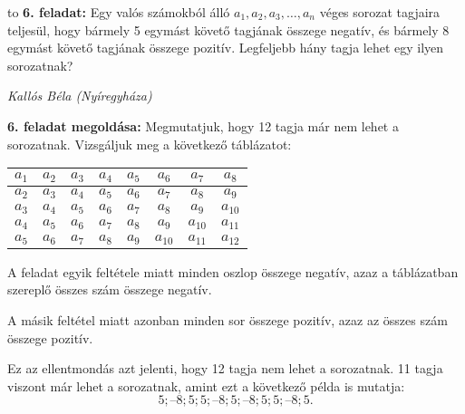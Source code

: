 \documentclass[a4paper,10pt]{article}
\def\ki#1#2{\hfill {\it #1 (#2)}\medskip}
\begin{document}
\hbox to 
{\bf 6. feladat: } Egy valós számokból álló $a_1, a_2, a_3,\dots, a_n$ véges sorozat tagjaira teljesül, hogy bármely 5 egymást
követő tagjának összege negatív, és bármely 8 egymást követő tagjának összege pozitív. Legfeljebb
hány tagja lehet egy ilyen sorozatnak?

\ki{Kallós Béla}{Nyíregyháza}\medskip

{\bf 6. feladat megoldása: }
Megmutatjuk, hogy 12 tagja már nem lehet a sorozatnak.
Vizsgáljuk meg a következő táblázatot:
\begin{center}
\begin{tabular}{|c|c|c|c|c|c|c|c|}
\hline
$a_1$ & $a_2$ & $a_3$ & $a_4$ & $a_5$ & $a_6$ & $a_7$ & $a_8$ \\
\hline
$a_2$ & $a_3$ & $a_4$ & $a_5$ & $a_6$ & $a_7$ & $a_8$ & $a_9$ \\
\hline
$a_3$ & $a_4$ & $a_5$ & $a_6$ & $a_7$ & $a_8$ & $a_9$ & $a_{10}$ \\
\hline
$a_4$ & $a_5$ & $a_6$ & $a_7$ & $a_8$ & $a_9$ & $a_{10}$ & $a_{11}$ \\
\hline
$a_5$ & $a_6$ & $a_7$ & $a_8$ & $a_9$ & $a_{10}$ & $a_{11}$ & $a_{12}$ \\
\hline
\end{tabular}
\end{center}

A feladat egyik feltétele miatt minden oszlop összege negatív, azaz a táblázatban szereplő
összes szám összege negatív.

A másik feltétel miatt azonban minden sor összege pozitív, azaz az összes szám összege
pozitív.

Ez az ellentmondás azt jelenti, hogy 12 tagja nem lehet a sorozatnak.
11 tagja viszont már lehet a sorozatnak, amint ezt a következő példa is mutatja:
$$5; –8; 5; 5; –8; 5; –8; 5; 5; –8; 5.$$
\medskip

\vfill
\end{document}
